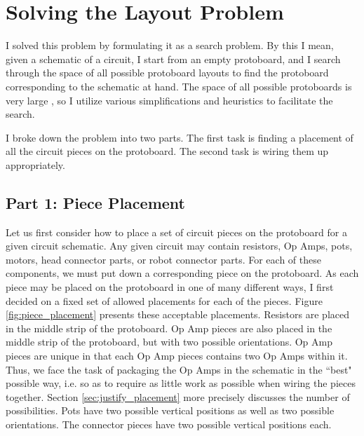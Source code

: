 \section{Solving the Layout Problem}

I solved this problem by formulating it as a search problem. By this I mean,
given a schematic of a circuit, I start from an empty protoboard, and I search
through the space of all possible protoboard layouts to find the protoboard
corresponding to the schematic at hand. The space of all possible protoboards is
very large \q, so I utilize various simplifications
and heuristics to facilitate the search.

I broke down the problem into two parts. The first task is finding a placement
of all the circuit pieces on the protoboard. The second task is wiring them up
appropriately.

\subsection{Part 1: Piece Placement}
\label{sec:placement}

Let us first consider how to place a set of circuit pieces on the protoboard for
a given circuit schematic. Any given circuit may contain resistors, Op Amps,
pots, motors, head connector parts, or robot connector parts. For each of these
components, we must put down a corresponding piece on the protoboard. As each
piece may be placed on the protoboard in one of many different ways, I first
decided on a fixed set of allowed placements for each of the pieces. Figure
\ref{fig:piece_placement} presents these acceptable placements.
Resistors are placed in the middle strip of the protoboard. Op Amp pieces are
also placed in the middle strip of the protoboard, but with two possible
orientations. Op Amp pieces are unique in that each Op Amp pieces contains two
Op Amps within it. Thus, we face the task of packaging the Op Amps in the
schematic in the ``best" possible way, i.e. so as to require as little work as
possible when wiring the pieces together. Section \ref{sec:justify_placement}
more precisely discusses the number of possibilities. Pots have two possible
vertical positions as well as two possible orientations.
The connector pieces have two possible vertical positions each.

